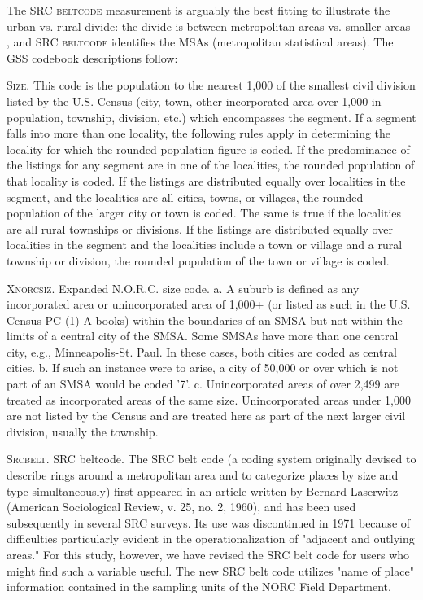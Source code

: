 \documentclass[11pt, letterpaper]{article}
\begin{document}
\begin{spacing}{1.4}
The \textsc{SRC beltcode} measurement is arguably the best fitting to illustrate the
urban vs. rural divide: the divide is between metropolitan areas vs. smaller areas
\citep{hansonCityJournalautumn15}, and \textsc{SRC beltcode} identifies the MSAs
(metropolitan statistical areas). The GSS codebook descriptions follow: 

\textsc{Size}. This code is the population to the nearest 1,000 of the smallest civil
division listed by the U.S. Census (city, town, other incorporated
area over 1,000 in population, township, division, etc.) which
encompasses the segment. If a segment falls into more than one
locality, the following rules apply in determining the locality for
which the rounded population figure is coded.
If the predominance of the listings for any segment are in one of the
localities, the rounded population of that locality is coded.
If the listings are distributed equally over localities in the
segment, and the localities are all cities, towns, or villages, the
rounded population of the larger city or town is coded. The same is
true if the localities are all rural townships or divisions.
If the listings are distributed equally over localities in the segment
and the localities include a town or village and a rural township or
division, the rounded population of the town or village is coded.

\textsc{Xnorcsiz}. Expanded N.O.R.C. size code. 
a. A suburb is defined as any incorporated area or unincorporated area
of 1,000+ (or listed as such in the U.S. Census PC (1)-A books) within
the boundaries of an SMSA but not within the limits of a central city
of the SMSA. Some SMSAs have more than one central city, e.g.,
Minneapolis-St. Paul. In these cases, both cities are coded as central
cities.
b. If such an instance were to arise, a city of 50,000 or over which is
not part of an SMSA would be coded '7'.
c. Unincorporated areas of over 2,499 are treated as incorporated areas
of the same size. Unincorporated areas under 1,000 are not listed by
the Census and are treated here as part of the next larger civil
division, usually the township.

\textsc{Srcbelt}. SRC beltcode. The SRC belt code (a coding system originally devised to describe
rings around a metropolitan area and to categorize places by size
and type simultaneously) first appeared in an article written by
Bernard Laserwitz (American Sociological Review, v. 25, no. 2, 1960),
and has been used subsequently in several SRC surveys.
Its use was discontinued in 1971 because of difficulties particularly
evident in the operationalization of "adjacent and outlying areas."
For this study, however, we have revised the SRC belt code for users
who might find such a variable useful. The new SRC belt code utilizes
"name of place" information contained in the sampling units
of the NORC Field Department.



\end{spacing}
\end{document}
